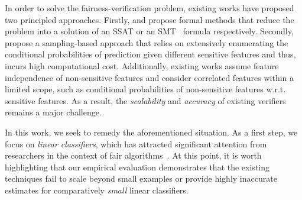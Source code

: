  	
	
	In order to solve the fairness-verification problem, existing works have proposed two principled approaches.	Firstly, \cite{ghosh2020justicia} and \cite{albarghouthi2017fairsquare} propose formal methods that reduce the problem into a solution of an SSAT or an SMT~ formula respectively.	Secondly, \cite{bastani2019probabilistic} propose a sampling-based approach that relies on extensively enumerating the conditional probabilities of prediction given different sensitive features and thus, incurs high computational cost. Additionally, existing works assume feature independence of non-sensitive features and consider correlated features within a limited scope, such as conditional probabilities of non-sensitive features w.r.t. sensitive features. As a result, the \textit{scalability} and \textit{accuracy} of existing  verifiers remains a major challenge.
	
	 In this work, we seek to remedy the aforementioned situation. As a first step, we focus on  \textit{linear classifiers}, which has attracted significant attention from researchers in the context of fair algorithms~\cite{pleiss2017fairness,zafar2017fairness,dressel2018accuracy, john2020verifying}. At this point, it is worth highlighting that our empirical evaluation demonstrates that the existing techniques fail to scale beyond small examples or provide highly inaccurate estimates for comparatively {\em small} linear classifiers. 
	
	
